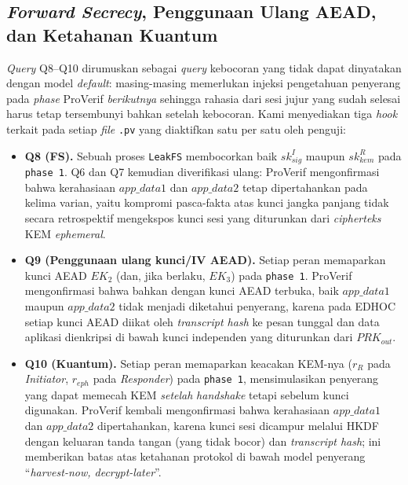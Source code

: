 \documentclass{easychair}
\begin{document}
\subsection{\emph{Forward Secrecy}, Penggunaan Ulang AEAD, dan Ketahanan Kuantum}
\emph{Query} Q8--Q10 dirumuskan sebagai \emph{query} kebocoran yang
tidak dapat dinyatakan dengan model \emph{default}: masing-masing
memerlukan injeksi pengetahuan penyerang pada \emph{phase} ProVerif
\emph{berikutnya} sehingga rahasia dari sesi jujur yang sudah selesai
harus tetap tersembunyi bahkan setelah kebocoran. Kami menyediakan
tiga \emph{hook} terkait pada setiap \emph{file} \texttt{.pv} yang
diaktifkan satu per satu oleh penguji:
\begin{itemize}[leftmargin=1.2em,itemsep=2pt,topsep=2pt]
\item \textbf{Q8 (FS).} Sebuah proses \texttt{LeakFS} membocorkan
baik $\mathit{sk}^I_{\mathit{sig}}$ maupun $\mathit{sk}^R_{\mathit{kem}}$
pada \texttt{phase 1}. Q6 dan Q7 kemudian diverifikasi ulang: ProVerif
mengonfirmasi bahwa kerahasiaan $\mathit{app\_data1}$ dan
$\mathit{app\_data2}$ tetap dipertahankan pada kelima varian, yaitu
kompromi pasca-fakta atas kunci jangka panjang tidak secara
retrospektif mengekspos kunci sesi yang diturunkan dari \emph{cipherteks}
KEM \emph{ephemeral}.
\item \textbf{Q9 (Penggunaan ulang kunci/IV AEAD).} Setiap peran
memaparkan kunci AEAD $EK_2$ (dan, jika berlaku, $EK_3$) pada
\texttt{phase 1}. ProVerif mengonfirmasi bahwa bahkan dengan kunci
AEAD terbuka, baik $\mathit{app\_data1}$ maupun $\mathit{app\_data2}$
tidak menjadi diketahui penyerang, karena pada EDHOC setiap kunci
AEAD diikat oleh \emph{transcript hash} ke pesan tunggal dan data
aplikasi dienkripsi di bawah kunci independen yang diturunkan dari
$\mathit{PRK}_{out}$.
\item \textbf{Q10 (Kuantum).} Setiap peran memaparkan keacakan KEM-nya
($r_R$ pada \emph{Initiator}, $r_{eph}$ pada \emph{Responder}) pada
\texttt{phase 1}, mensimulasikan penyerang yang dapat memecah KEM
\emph{setelah} \emph{handshake} tetapi sebelum kunci digunakan.
ProVerif kembali mengonfirmasi bahwa kerahasiaan $\mathit{app\_data1}$
dan $\mathit{app\_data2}$ dipertahankan, karena kunci sesi dicampur
melalui HKDF dengan keluaran tanda tangan (yang tidak bocor) dan
\emph{transcript hash}; ini memberikan batas atas ketahanan protokol
di bawah model penyerang ``\emph{harvest-now, decrypt-later}''.
\end{itemize}
\end{document}
